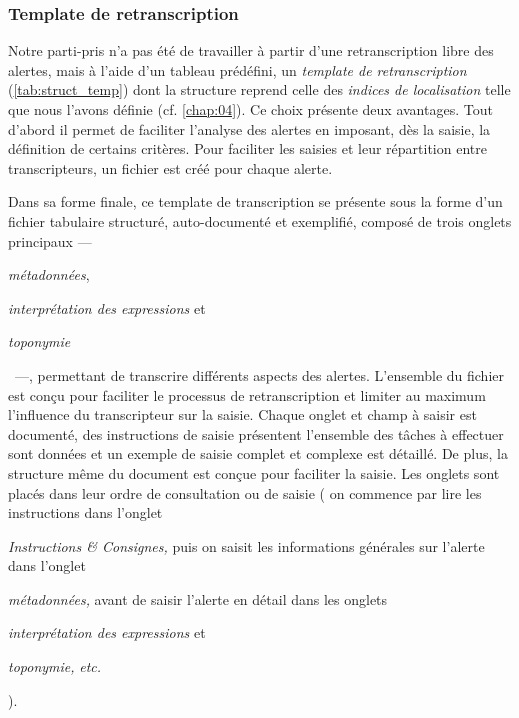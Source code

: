 \subsubsection{Template de retranscription}

Notre parti-pris n'a pas été de travailler à partir d'une
retranscription libre des alertes, mais à l'aide d'un tableau
prédéfini, un \emph{template de retranscription}
(\autoref{tab:struct_temp}) dont la structure reprend celle des
\emph{indices de localisation} telle que nous l'avons définie
(cf. \autoref{chap:04}). Ce choix présente deux avantages. Tout
d'abord il permet de faciliter l'analyse des alertes en imposant, dès
la saisie, la définition de certains critères. Pour faciliter les
saisies et leur répartition entre transcripteurs, un fichier est créé
pour chaque alerte.

Dans sa forme finale, ce template de transcription se présente sous la
forme d'un fichier tabulaire structuré, auto-documenté et exemplifié,
composé de trois onglets principaux
%
---~\begin{enumerate*}[label=(\alph*)]
\item \emph{métadonnées},
\item \emph{interprétation des expressions} et
\item \emph{toponymie}
\end{enumerate*}~---,
%
permettant de transcrire différents aspects des alertes. L'ensemble du
fichier est conçu pour faciliter le processus de retranscription et
limiter au maximum l'influence du transcripteur sur la saisie. Chaque
onglet et champ à saisir est documenté, des instructions de saisie
présentent l'ensemble des tâches à effectuer sont données et un
exemple de saisie complet et complexe est détaillé. De plus, la
structure même du document est conçue pour faciliter la saisie. Les
onglets sont placés dans leur ordre de consultation ou de saisie (\eg
on commence par lire les instructions dans l'onglet
%
\begin{enumerate*}[label=(\arabic*)]
\item \emph{Instructions \& Consignes,} puis on saisit les
  informations générales sur l'alerte dans l'onglet
\item \emph{métadonnées,} avant de saisir l'alerte en détail dans les
  onglets
\item \emph{interprétation des expressions} et
\item \emph{toponymie,} \emph{etc.}
\end{enumerate*}).

